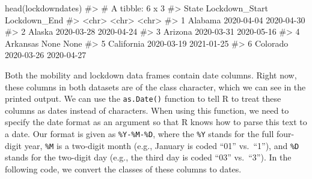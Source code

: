 \documentclass[
  letterpaper,
]{latex/krantz}
\makeatletter
\newenvironment{Shaded}{\begin{snugshade}}{\end{snugshade}}
\newcommand{\AttributeTok}[1]{\textcolor[rgb]{0.40,0.45,0.13}{#1}}
\newcommand{\CommentTok}[1]{\textcolor[rgb]{0.37,0.37,0.37}{#1}}
\newcommand{\FunctionTok}[1]{\textcolor[rgb]{0.28,0.35,0.67}{#1}}
\newcommand{\NormalTok}[1]{\textcolor[rgb]{0.00,0.23,0.31}{#1}}
\newcommand{\OtherTok}[1]{\textcolor[rgb]{0.00,0.23,0.31}{#1}}
\newcommand{\SpecialCharTok}[1]{\textcolor[rgb]{0.37,0.37,0.37}{#1}}
\newcommand{\StringTok}[1]{\textcolor[rgb]{0.13,0.47,0.30}{#1}}
\newenvironment{kframe}{%
\medskip{}
\setlength{\fboxsep}{.8em}
 \def\at@end@of@kframe{}%
 \ifinner\ifhmode%
  \def\at@end@of@kframe{\end{minipage}}%
  \begin{minipage}{\columnwidth}%
 \fi\fi%
 \def\FrameCommand##1{\hskip\@totalleftmargin \hskip-\fboxsep
 \colorbox{shadecolor}{##1}\hskip-\fboxsep
     \hskip-\linewidth \hskip-\@totalleftmargin \hskip\columnwidth}%
 \MakeFramed {\advance\hsize-\width
   \@totalleftmargin\z@ \linewidth\hsize
   \@setminipage}}%
 {\par\unskip\endMakeFramed%
 \at@end@of@kframe}
\renewenvironment{Shaded}{\begin{kframe}}{\end{kframe}}
\makeatother
\begin{document}
\begin{Shaded}
\begin{Highlighting}[]
\FunctionTok{head}\NormalTok{(lockdowndates)}
\CommentTok{\#\textgreater{} \# A tibble: 6 x 3}
\CommentTok{\#\textgreater{}   State      Lockdown\_Start Lockdown\_End}
\CommentTok{\#\textgreater{}   \textless{}chr\textgreater{}      \textless{}chr\textgreater{}          \textless{}chr\textgreater{}       }
\CommentTok{\#\textgreater{} 1 Alabama    2020{-}04{-}04     2020{-}04{-}30  }
\CommentTok{\#\textgreater{} 2 Alaska     2020{-}03{-}28     2020{-}04{-}24  }
\CommentTok{\#\textgreater{} 3 Arizona    2020{-}03{-}31     2020{-}05{-}16  }
\CommentTok{\#\textgreater{} 4 Arkansas   None           None        }
\CommentTok{\#\textgreater{} 5 California 2020{-}03{-}19     2021{-}01{-}25  }
\CommentTok{\#\textgreater{} 6 Colorado   2020{-}03{-}26     2020{-}04{-}27}
\end{Highlighting}
\end{Shaded}

Both the mobility and lockdown data frames contain date columns. Right
now, these columns in both datasets are of the class character, which we
can see in the printed output. We can use the
\texttt{as.Date()}
function to tell R to treat these columns as dates instead of
characters. When using this function, we need to specify the date format
 as an argument so that R knows how to parse this
text to a date. Our format is given as \texttt{\%Y-\%M-\%D}, where the
\texttt{\%Y} stands for the full four-digit year, \texttt{\%M} is a
two-digit month (e.g., January is coded ``01'' vs.~``1''), and
\texttt{\%D} stands for the two-digit day (e.g., the third day is coded
``03'' vs.~``3''). In the following code, we convert the classes of
these columns to dates.

\begin{Shaded}
\end{Shaded}
\end{document}
